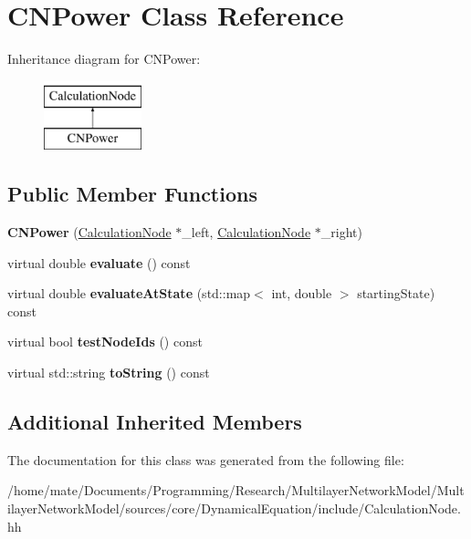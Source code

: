 \hypertarget{classCNPower}{}\section{C\+N\+Power Class Reference}
\label{classCNPower}
Inheritance diagram for C\+N\+Power\+:\begin{figure}[H]
\begin{center}
\leavevmode
\includegraphics[height=2.000000cm]{classCNPower}
\end{center}
\end{figure}
\subsection*{Public Member Functions}
\begin{DoxyCompactItemize}
\item 
{\bfseries C\+N\+Power} (\hyperlink{classCalculationNode}{Calculation\+Node} $\ast$\+\_\+left, \hyperlink{classCalculationNode}{Calculation\+Node} $\ast$\+\_\+right)\hypertarget{classCNPower_ac5ba8a91170451bc06afbf7153d7f707}{}\label{classCNPower_ac5ba8a91170451bc06afbf7153d7f707}

\item 
virtual double {\bfseries evaluate} () const \hypertarget{classCNPower_a9461646cf8e9fc0cb54318e04d73ed72}{}\label{classCNPower_a9461646cf8e9fc0cb54318e04d73ed72}

\item 
virtual double {\bfseries evaluate\+At\+State} (std\+::map$<$ int, double $>$ starting\+State) const \hypertarget{classCNPower_af4a31cbe51bc44fba203bda91d46384f}{}\label{classCNPower_af4a31cbe51bc44fba203bda91d46384f}

\item 
virtual bool {\bfseries test\+Node\+Ids} () const \hypertarget{classCNPower_a3d1e004e5e71954037b2ea46f54cd438}{}\label{classCNPower_a3d1e004e5e71954037b2ea46f54cd438}

\item 
virtual std\+::string {\bfseries to\+String} () const \hypertarget{classCNPower_a5d9c427cba2ea13f2bf91ecadcac50ef}{}\label{classCNPower_a5d9c427cba2ea13f2bf91ecadcac50ef}

\end{DoxyCompactItemize}
\subsection*{Additional Inherited Members}


The documentation for this class was generated from the following file\+:\begin{DoxyCompactItemize}
\item 
/home/mate/\+Documents/\+Programming/\+Research/\+Multilayer\+Network\+Model/\+Multilayer\+Network\+Model/sources/core/\+Dynamical\+Equation/include/Calculation\+Node.\+hh\end{DoxyCompactItemize}
